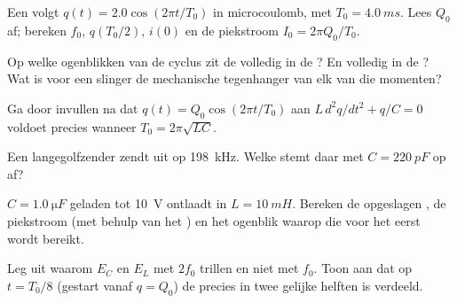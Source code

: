 \begin{exercise}[$\star$]\label{exo:g12:rlc-oscillations:4}
Een  volgt $q(t) = 2.0\cos(2\pi t/T_0)$ in microcoulomb, met
$T_0 = \qty{4.0}{ms}$. Lees $Q_0$ af; bereken $f_0$, $q(T_0/2)$, $i(0)$ en de
piekstroom $I_0 = 2\pi Q_0/T_0$.
\end{exercise}

\begin{exercise}[$\star$]\label{exo:g12:rlc-oscillations:5}
Op welke ogenblikken van de cyclus zit de  volledig in de ?
En volledig in de ? Wat is voor een slinger de mechanische tegenhanger
van elk van die momenten?
\end{exercise}

\begin{exercise}[$\star\star$]\label{exo:g12:rlc-oscillations:6}
Ga door invullen na dat $q(t) = Q_0\cos(2\pi t/T_0)$ aan
$L\,d^2q/dt^2 + q/C = 0$ voldoet precies wanneer $T_0 = 2\pi\sqrt{LC}$.
\end{exercise}

\begin{exercise}[$\star\star$]\label{exo:g12:rlc-oscillations:7}
Een langegolfzender zendt uit op \qty{198}{kHz}. Welke  stemt daar
met $C = \qty{220}{pF}$ op af?
\end{exercise}

\begin{exercise}[$\star\star$]\label{exo:g12:rlc-oscillations:8}
$C = \qty{1.0}{\micro F}$ geladen tot \qty{10}{V} ontlaadt in
$L = \qty{10}{mH}$. Bereken de opgeslagen , de piekstroom (met behulp
van het ) en het ogenblik waarop die voor het eerst wordt
bereikt.
\end{exercise}

\begin{exercise}[$\star\star$]\label{exo:g12:rlc-oscillations:9}
Leg uit waarom $E_C$ en $E_L$ met  $2f_0$ trillen en niet met $f_0$.
Toon aan dat op $t = T_0/8$ (gestart vanaf $q = Q_0$) de  precies in
twee gelijke helften is verdeeld.
\end{exercise}

